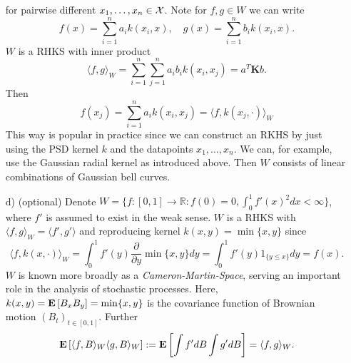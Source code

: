 \begin{example}[RKHS]
\begin{itemize}
	for pairwise different $x_1, \ldots, x_n \in \mathcal{X}$. Note for $f, g \in W$ we can write
	\begin{equation*}
		f(x) = \sum_{i=1}^n a_i k(x_i, x), \quad g(x) = \sum_{i=1}^n b_i k(x_i, x).
	\end{equation*}
	$W$ is a RHKS with inner product
	\begin{equation*}
		\langle f, g \rangle_W = \sum_{i=1}^n\sum_{j=1}^n a_i b_i k(x_i, x_j) = a^T\mathbf{K}b.
	\end{equation*}
	Then					 
	\begin{equation*}
		f(x_j) = \sum_{i=1}^n a_i k(x_i, x_j) = \langle f, k(x_j, \cdot ) \rangle_W
	\end{equation*}
	This way is popular in practice since we can construct an RKHS by just using the PSD kernel $k$ and the datapoints $x_1, \ldots, x_n$. We can, for example, use the Gaussian radial kernel as introduced above. Then $W$ consists of linear combinations of Gaussian bell curves. %
	\item[d)] (optional) Denote $W = \{f \colon [0, 1] \rightarrow \mathbb{R} : f(0) = 0, \int_0^1 f'(x)^2 dx < \infty \}$, where $f'$ is assumed to exist in the weak sense. $W$ is a RHKS with $\langle f, g \rangle_W = \langle f', g' \rangle$ and reproducing kernel $k(x, y) = \min\{x, y\}$ since 
	\begin{equation*} 
		\langle f, k(x, \cdot) \rangle_W = \int_0^1 f'(y)\frac{\partial }{\partial y} \min\{x, y\}dy = \int_0^1 f'(y)1_{\{y \leq x\}} dy = f(x).
	\end{equation*}
	$W$ is known more broadly as a \emph{Cameron-Martin-Space}, serving an important role in the analysis of stochastic processes. Here, $k(x, y) = \mathbf{E}\left[B_xB_y \right] = \min\{x, y\}$ is the covariance function of Brownian motion $(B_t)_{t \in [0, 1]}$. Further 
	\begin{equation*}
		\mathbf{E}\left[\langle f, B \rangle_W \langle g, B  \rangle_W \right] := \mathbf{E}\left[\int f' dB \int g' dB \right] = \langle f, g \rangle_W.
	\end{equation*}
\end{itemize}
\end{example}

